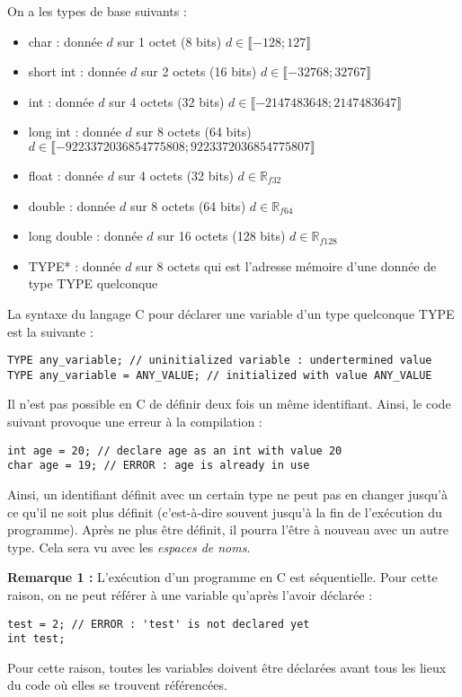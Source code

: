 \documentclass[../../../main.tex]{subfiles}
\begin{document}
On a les types de base suivants :
\begin{itemize}
	\item \textsf{char} : donnée $d$ sur 1 octet (8 bits) $d\in{\llbracket-128; 127\rrbracket}$
	\item \textsf{short int} : donnée $d$ sur 2 octets (16 bits) $d\in{\llbracket-32768; 32767\rrbracket}$
	\item \textsf{int} : donnée $d$ sur 4 octets (32 bits) $d\in{\llbracket-2147483648; 2147483647\rrbracket}$
	\item \textsf{long int} : donnée $d$ sur 8 octets (64 bits) $d\in{\llbracket-9223372036854775808; 9223372036854775807\rrbracket}$
	\item \textsf{float} : donnée $d$ sur 4 octets (32 bits) $d\in{\mathbb{R}_{f32}}$
	\item \textsf{double} : donnée $d$ sur 8 octets (64 bits) $d\in{\mathbb{R}_{f64}}$
	\item \textsf{long double} : donnée $d$ sur 16 octets (128 bits) $d\in{\mathbb{R}_{f128}}$
	\item \textsf{TYPE*} : donnée $d$ sur 8 octets qui est l'adresse mémoire d'une donnée de type \textsf{TYPE} quelconque
\end{itemize}
La syntaxe du langage C pour déclarer une variable d'un type quelconque \textsf{TYPE} est la suivante :
\begin{verbatim}
TYPE any_variable; // uninitialized variable : undertermined value
TYPE any_variable = ANY_VALUE; // initialized with value ANY_VALUE
\end{verbatim}
Il n'est pas possible en C de définir deux fois un même identifiant. Ainsi, le code suivant provoque une erreur à la compilation :
\begin{verbatim}
int age = 20; // declare age as an int with value 20
char age = 19; // ERROR : age is already in use
\end{verbatim}
Ainsi, un identifiant définit avec un certain type ne peut pas en changer jusqu'à ce qu'il ne soit plus définit (c'est-à-dire souvent jusqu'à la fin de l'exécution du programme). Après ne plus être définit, il pourra l'être à nouveau avec un autre type. Cela sera vu avec les \textit{espaces de noms}.
 
\textbf{Remarque 1 :} L'exécution d'un programme en C est séquentielle. Pour cette raison, on ne peut référer à une variable qu'après l'avoir déclarée :
\begin{verbatim}
test = 2; // ERROR : 'test' is not declared yet
int test;
\end{verbatim}
Pour cette raison, toutes les variables doivent être déclarées avant tous les lieux du code où elles se trouvent référencées.
 
\end{document}
